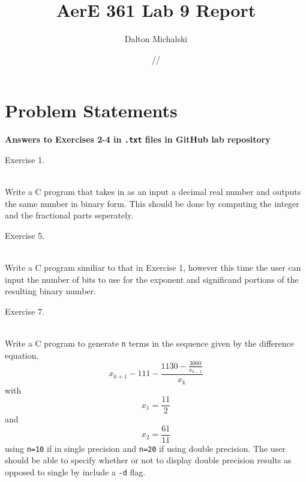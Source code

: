 \documentclass[11pt]{report}
\title{\textbf{AerE 361 Lab 9 Report}}
\author{Dalton Michalski}
\date{\oldstylenums{10}/\oldstylenums{23}/\oldstylenums{2018}}
\newcommand{\code}[1]{\colorbox{light-gray}{\texttt{#1}}}
\begin{document}
\maketitle
 
\section{Problem Statements}
	\textbf{Answers to Exercises 2-4 in \code{.txt} files in GitHub lab repository}
    \begin{outline}
    	\item Exercise 1.
    	\begin{list}
    	    \item \\ Write a C program that takes in as an input a decimal real number and outputs the same number in binary form. This should be done by computing the integer and the fractional parts seperately.
    	\end{list}
    	\item Exercise 5.
    	\begin{list}
    	    \item \\ Write a C program similiar to that in Exercise 1, however this time the user can input the number of bits to use for the exponent and significand portions of the resulting binary number.
    	\end{list}
    	\item Exercise 7.
    	\begin{list}
    	    \item \\ Write a C program to generate \code{n} terms in the sequence given by the difference equation, \begin{equation} \label{eq:1}
    	        x_{k+1}-111-\frac{1130-\frac{3000}{x_{k-1}}}{x_k}
    	    \end{equation}
    	    with \begin{equation}
    	        x_1 = \frac{11}{2}
    	    \end{equation}
    	    and \begin{equation}
    	        x_2 = \frac{61}{11}
    	    \end{equation}
    	    using \code{n=10} if in single precision and \code{n=20} if using double precision. The user should be able to specify whether or not to display double precision results as opposed to single by include a \code{-d} flag.
    	\end{list}
	\end{outline}
\newpage
\end{document}
